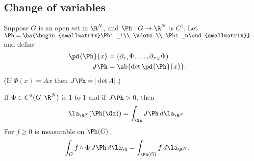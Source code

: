 
\subsection{Change of variables}
Suppose $G$ is an open set in $\R^N$, and $\Ph:G\to \R^N$ is $C^1$. Let $\Ph=\ba{\begin{smallmatrix}\Phi_1\\ \vdots \\ \Phi_n\end{smallmatrix}}$ and define
\begin{align*}
\pd{\Ph}{x}&=(\partial_{x_1}\Phi,\ldots, \partial_{x_N}\Phi)\\
J\Ph&=\ab{\det \pd{\Ph}{x}}.
\end{align*}
(If $\Phi(x)=Ax$ then $J\Ph=|\det A|$.)
\begin{thm}
If $\Phi\in C^2(G;\R^N)$ is 1-to-1 and if $J\Ph>0$, then 
\[\la_{\R^N}(\Ph(\Ga))=\int_{\Ga} J\Ph \,d\la_{\R^N}.\]
For $f\ge 0$ is measurable on $\Ph(G)$,
\[
\int_G f\circ\Phi \,J\Ph\,d\la_{\R}=\int_{\Ph(G)} f\,d\la_{\R^N}.
\]
\end{thm}
